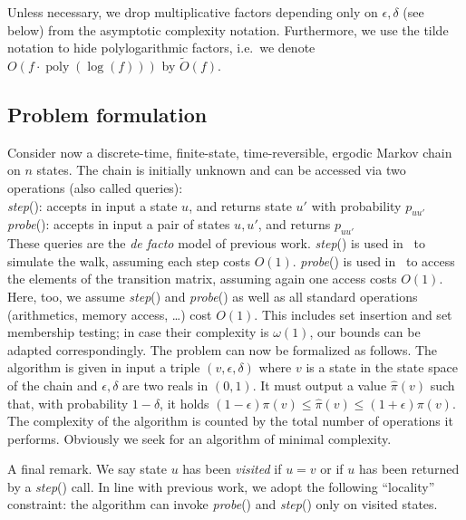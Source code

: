 \documentclass[a4paper,11pt]{article}
\newcommand{\poly}{\operatorname{poly}}
\newcommand{\step}{\textit{step}}
\newcommand{\probe}{\textit{probe}}
\begin{document}
Unless necessary, we drop multiplicative factors depending only on $\epsilon,\delta$ (see below) from the asymptotic complexity notation.
Furthermore, we use the tilde notation to hide polylogarithmic factors, i.e.\ we denote $O(f \cdot \poly(\log(f)))$ by $\tilde{O}(f)$.

\subsection{Problem formulation}
\label{sub:problem}
Consider now a discrete-time, finite-state, time-reversible, ergodic Markov chain on $n$ states.
The chain is initially unknown and can be accessed via two operations (also called queries):
\\[3pt]
\hspace*{1em}\step(): accepts in input a state $u$, and returns state $u'$ with probability $p_{uu'}$
\\[3pt]
\hspace*{1em}\probe(): accepts in input a pair of states $u,u'$, and returns $p_{uu'}$
\\[3pt]
These queries are the \textit{de facto} model of previous work.
\step() is used in~\cite{Borgs&2012,Lee&2013,Borgs&2014,Lofgren&2014b,Lofgren&2015,Lofgren&2015b} to simulate the walk, assuming each step costs $O(1)$.
\probe() is used in~\cite{Lofgren&2014b,Lofgren&2015,Lofgren&2015b} to access the elements of the transition matrix, assuming again one access costs $O(1)$.
Here, too, we assume \step() and \probe() as well as all standard operations (arithmetics, memory access, \ldots) cost $O(1)$.
This includes set insertion and set membership testing; in case their complexity is $\omega(1)$, our bounds can be adapted correspondingly.
The problem can now be formalized as follows.
The algorithm is given in input a triple $(v,\epsilon,\delta)$ where $v$ is a state in the state space of the chain and $\epsilon,\delta$ are two reals in $(0,1)$.
It must output a value $\hat{\pi}(v)$ such that, with probability $1-\delta$, it holds $(1-\epsilon)\pi(v) \le \hat{\pi}(v) \le (1+\epsilon)\pi(v)$.
The complexity of the algorithm is counted by the total number of operations it performs.
Obviously we seek for an algorithm of minimal complexity.

A final remark.
We say state $u$ has been \emph{visited} if $u = v$ or if $u$ has been returned by a \step() call.
In line with previous work, we adopt the following ``locality'' constraint: the algorithm can invoke \probe() and \step() only on visited states.
\end{document}

